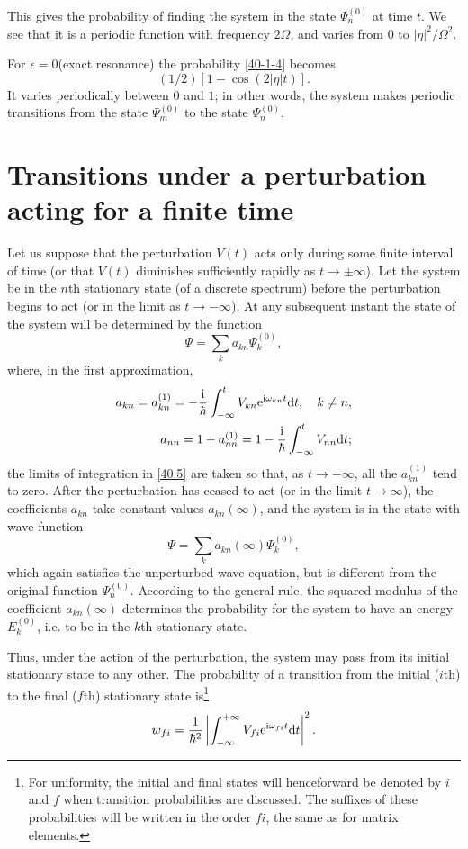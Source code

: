 {This gives the probability of finding the system in the state $ \Psi_n^{(0)} $ at time $ t $. We see that it is a periodic function with frequency $ 2\Omega $, and varies from $ 0 $ to $ |\eta|^2/\Omega^2 $.

For $ \epsilon= 0  $(exact resonance) the probability \eqref{40-1-4} becomes
\[ (1/2)\left[1-\cos(2|\eta|t) \right]. \]
It varies periodically between $ 0 $ and $ 1 $; in other words, the system makes periodic transitions from the state $ \Psi_m^{(0)} $ to the state $ \Psi_n^{(0)} $.
}

\section{Transitions under a perturbation acting for a finite time}\label{Transitions under a perturbation acting for a finite time}

Let us suppose that the perturbation $ V (t) $ acts only during some finite interval of time (or that $ V (t) $ diminishes sufficiently rapidly as $ t \to\pm\infty  $). Let the system be in the $ n $th stationary state (of a discrete spectrum) before the perturbation begins to act (or in the limit as $ t \to-\infty  $). At any subsequent instant the state of the system will be determined by the function
\[ \Psi=\sum_k a_{kn}\Psi_k^{(0)} ,\]
where, in the first approximation,
\begin{equation}\label{41.1}
\begin{split}
a_{kn}=a_{kn}^{(1)}=-\frac{\mathrm{i}}{\hbar}\int_{-\infty}^tV_{kn}\mathrm{e}^{\mathrm{i}\omega_{kn}t}\mathrm{d} t,\quad k\ne n,\\
a_{nn}=1+a_{nn}^{(1)}=1-\frac{\mathrm{i}}{\hbar}\int_{-\infty}^{t}V_{nn}\mathrm{d} t;
\end{split}
\end{equation}
the limits of integration in \eqref{40.5} are taken so that, as $ t \to-\infty  $, all the $ a_{kn}^{(1)} $ tend to zero. After the perturbation has ceased to act (or in the limit $ t \to\infty $), the coefficients $ a_{kn} $ take constant values $ a_{kn}(\infty) $, and the system is in the state with wave function
\[ \Psi=\sum_ka_{kn}(\infty)\Psi_k^{(0)}, \]
which again satisfies the unperturbed wave equation, but is different from the original function $ \Psi_n^{(0)} $. According to the general rule, the squared modulus of the coefficient $ a_{kn}(\infty) $ determines the probability for the system to have an energy $ E_k^{(0)} $, i.e. to be in the $ k $th stationary state.

Thus, under the action of the perturbation, the system may pass from its initial stationary state to any other. The probability of a transition from the initial ($ i $th) to the final ($ f $th) stationary state is\footnote{For uniformity, the initial and final states will henceforward be denoted by $ i $ and $ f $ when transition probabilities are discussed. The suffixes of these probabilities will be written in the order $ fi $, the same as for matrix elements.}
\begin{equation}\label{41.2}
w_{fi}=\frac{1}{\hbar^2}\left|\int_{-\infty}^{+\infty}V_{fi}\mathrm{e}^{\mathrm{i}\omega_{fi}t}\mathrm{d} t \right|^2.
\end{equation}


